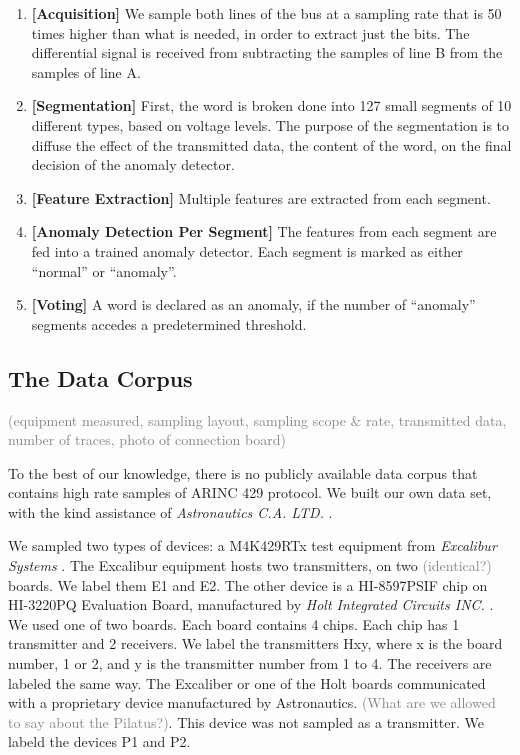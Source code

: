 \documentclass[conference]{IEEEtran}
\begin{document}
  \begin{enumerate}
    \item \textbf{[Acquisition]}
          We sample both lines of the bus at a sampling rate that is 50 times higher than what is needed, in order to extract just the bits. The differential signal is received from subtracting the samples of line B from the samples of line A.
    \item \textbf{[Segmentation]}
          First, the word is broken done into 127 small segments of 10 different types, based on voltage levels. The purpose of the segmentation is to diffuse the effect of the transmitted data, the content of the word, on the final decision of the anomaly detector.
    \item \textbf{[Feature Extraction]}
          Multiple features are extracted from each segment. 
    \item \textbf{[Anomaly Detection Per Segment]}
          The features from each segment are fed into a trained anomaly detector. Each segment is marked as either ``normal'' or ``anomaly''.
    \item \textbf{[Voting]}
          A word is declared as an anomaly, if the number of ``anomaly'' segments accedes a predetermined threshold.
  \end{enumerate}
  
\subsection{The Data Corpus}
  \textcolor{gray}{(equipment measured, sampling layout, sampling scope \& rate, transmitted data, number of traces, photo of connection board)}
  
  To the best of our knowledge, there is no publicly available data corpus that contains high rate samples of ARINC 429 protocol. We built our own data set, with the kind assistance of \textit{Astronautics C.A. LTD.} \cite{}.
  
  We sampled two types of devices: a M4K429RTx test equipment from \textit{Excalibur Systems} \cite{}. The Excalibur equipment hosts two transmitters, on two \textcolor{gray}{(identical?)} boards. We label them E1 and E2. The other device is a HI-8597PSIF chip on HI-3220PQ Evaluation Board, manufactured by \textit{Holt Integrated Circuits INC.} \cite{}. We used one of two boards. Each board contains 4 chips. Each chip has 1 transmitter and 2 receivers. We label the transmitters H{x}{y}, where x is the board number, 1 or 2, and y is the transmitter number from 1 to 4. The receivers are labeled the same way. The Excaliber or one of the Holt boards communicated with a proprietary device manufactured by Astronautics. \textcolor{gray}{(What are we allowed to say about the Pilatus?)}. This device was not sampled as a transmitter. We labeld the devices P1 and P2.
  
\end{document}
